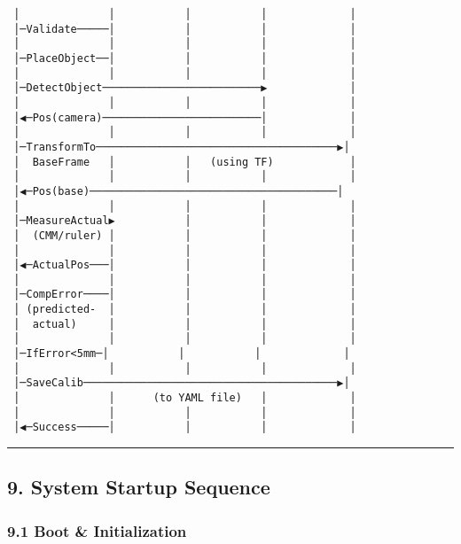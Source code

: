 \documentclass[
]{article}
\begin{document}
\begin{verbatim}
 │              │           │           │             │
 │─Validate─────│           │           │             │
 │              │           │           │             │
 │─PlaceObject──│           │           │             │
 │              │           │           │             │
 │─DetectObject─────────────────────────▶             │
 │              │           │           │             │
 │◀─Pos(camera)─────────────────────────│             │
 │              │           │           │             │
 │─TransformTo──────────────────────────────────────▶│
 │  BaseFrame   │           │   (using TF)            │
 │              │           │           │             │
 │◀─Pos(base)───────────────────────────────────────│
 │              │           │           │             │
 │─MeasureActual▶           │           │             │
 │  (CMM/ruler) │           │           │             │
 │              │           │           │             │
 │◀─ActualPos───│           │           │             │
 │              │           │           │             │
 │─CompError────│           │           │             │
 │ (predicted-  │           │           │             │
 │  actual)     │           │           │             │
 │              │           │           │             │
 │─IfError<5mm─│           │           │             │
 │              │           │           │             │
 │─SaveCalib────────────────────────────────────────▶│
 │              │      (to YAML file)   │             │
 │              │           │           │             │
 │◀─Success─────│           │           │             │
\end{verbatim}

\begin{center}\rule{0.5\linewidth}{0.5pt}\end{center}

\hypertarget{system-startup-sequence}{%
\subsection{9. System Startup Sequence}\label{system-startup-sequence}}

\hypertarget{boot-initialization}{%
\subsubsection{9.1 Boot \& Initialization}\label{boot-initialization}}
\end{document}
